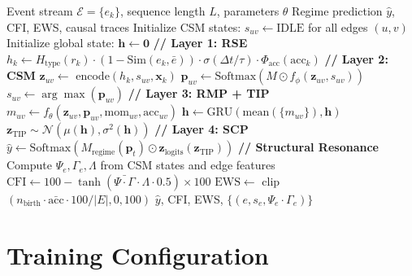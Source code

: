 \documentclass[11pt]{article}
\newcommand{\Softmax}{\mathrm{Softmax}}
\newcommand{\GRU}{\mathrm{GRU}}
\newcommand{\TIP}{\mathrm{TIP}}
\newcommand{\CFI}{\mathrm{CFI}}
\newcommand{\EWS}{\mathrm{EWS}}
\begin{document}
\begin{algorithm}[h]
\caption{KAIROS: Causal Temporal Graph Compilation}
\label{alg:kairos}
\begin{algorithmic}[1]
\REQUIRE Event stream $\mathcal{E} = \{e_k\}$, sequence length $L$, parameters $\theta$
\ENSURE Regime prediction $\hat{y}$, CFI, EWS, causal traces
\STATE Initialize CSM states: $s_{uv} \gets \text{IDLE}$ for all edges $(u,v)$
\STATE Initialize global state: $\mathbf{h} \gets \mathbf{0}$
    \STATE \textbf{// Layer 1: RSE}
    \STATE $h_k \gets H_{\text{type}}(r_k) \cdot (1 - \text{Sim}(e_k, \bar{e})) \cdot \sigma(\Delta t / \tau) \cdot \Phi_{\text{acc}}(\text{acc}_k)$
    \STATE \textbf{// Layer 2: CSM}
    \STATE $\mathbf{z}_{uv} \gets$ encode$(h_k, s_{uv}, \mathbf{x}_k)$
    \STATE $\mathbf{p}_{uv} \gets \Softmax(M \odot f_\phi(\mathbf{z}_{uv}, s_{uv}))$
    \STATE $s_{uv} \gets \arg\max(\mathbf{p}_{uv})$ 
    \STATE \textbf{// Layer 3: RMP + TIP}
    \STATE $m_{uv} \gets f_\theta(\mathbf{z}_{uv}, \mathbf{p}_{uv}, \text{mom}_{uv}, \text{acc}_{uv})$
    \STATE $\mathbf{h} \gets \GRU(\text{mean}(\{m_{uv}\}), \mathbf{h})$
    \STATE $\mathbf{z}_{\TIP} \sim \mathcal{N}(\mu(\mathbf{h}), \sigma^2(\mathbf{h}))$
\ENDFOR
\STATE \textbf{// Layer 4: SCP}
\STATE $\hat{y} \gets \Softmax(M_{\text{regime}}(\mathbf{p}_t) \odot \mathbf{z}_{\text{logits}}(\mathbf{z}_{\TIP}))$
\STATE \textbf{// Structural Resonance}
\STATE Compute $\Psi_e, \Gamma_e, \Lambda$ from CSM states and edge features
\STATE $\CFI \gets 100 - \tanh(\bar{\Psi \cdot \Gamma} \cdot \Lambda \cdot 0.5) \times 100$
\STATE $\EWS \gets$ clip$(n_{\text{birth}} \cdot \bar{\text{acc}} \cdot 100 / |E|, 0, 100)$
\RETURN $\hat{y}$, CFI, EWS, $\{(e, s_e, \Psi_e \cdot \Gamma_e)\}$
\end{algorithmic}
\end{algorithm}

\section{Training Configuration}
\end{document}
